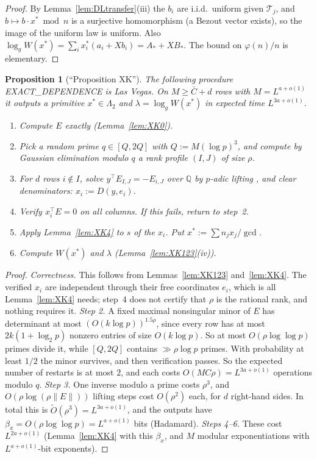 \documentclass[11pt]{amsart}
\newtheorem{proposition}[theorem]{Proposition}
\theoremstyle{definition}
\newcommand{\Q}{\mathbb{Q}}
\newcommand{\cT}{\mathcal{T}}
\begin{document}
\begin{proof}
By Lemma~\ref{lem:DLtransfer}(iii) the $b_i$ are i.i.d.\ uniform given $\cT_j$, and $b\mapsto b\cdot x^*\bmod n$ is a surjective homomorphism
(a Bezout vector exists), so the image of the uniform law is uniform. Also $\log_gW(x^*)=\sum_ix^*_i(a_i+Xb_i)=A_*+XB_*$. The bound on $\varphi(n)/n$ is
elementary.
\end{proof}

\begin{proposition}[``Proposition XK'']\label{prop:XK}
The following procedure EXACT\_DEPENDENCE is Las Vegas. On $M\ge\bar C+d$ rows with $M=L^{a+o(1)}$ it outputs a primitive $x^*\in\Lambda_2$ and
$\lambda=\log_gW(x^*)$ in expected time $L^{3a+o(1)}$.
\begin{enumerate}[label=\arabic*.]
\item Compute $E$ exactly (Lemma~\ref{lem:XK0}).
\item Pick a random prime $q\in[Q,2Q]$ with $Q:=M(\log p)^3$, and compute by Gaussian elimination modulo $q$ a rank profile $(I,J)$ of size $\rho$.
\item For $d$ rows $i\notin I$, solve $y^\top E_{I,J}=-E_{i,J}$ over $\Q$ by $p$-adic lifting \cite{dixon1982}, and clear denominators: $x_i:=D(y,e_i)$.
\item Verify $x_i^\top E=0$ on all columns. If this fails, return to step~2.
\item Apply Lemma~\ref{lem:XK4} to $s$ of the $x_i$. Put $x^*:=\sum n_jx_j/\gcd$.
\item Compute $W(x^*)$ and $\lambda$ (Lemma~\ref{lem:XK123}(iv)).
\end{enumerate}
\end{proposition}

\begin{proof}
\emph{Correctness.} This follows from Lemmas~\ref{lem:XK123} and~\ref{lem:XK4}. The verified $x_i$ are independent through their free coordinates $e_i$,
which is all Lemma~\ref{lem:XK4} needs; step~4 does not certify that $\rho$ is the rational rank, and nothing requires it.
\emph{Step 2.} A fixed maximal nonsingular minor of $E$ has determinant at most $(O(k\log p))^{1.5\rho}$, since every row has at most $2k(1+\log_2p)$
nonzero entries of size $O(k\log p)$. So at most $O(\rho\log\log p)$ primes divide it, while $[Q,2Q]$ contains $\gg\rho\log p$ primes. With probability
at least $1/2$ the minor survives, and then verification passes. So the expected number of restarts is at most $2$, and each costs
$O(MC\rho)=L^{3a+o(1)}$ operations modulo $q$.
\emph{Step 3.} One inverse modulo a prime costs $\rho^3$, and $O(\rho\log(\rho\|E\|))$ lifting steps cost $O(\rho^2)$ each, for $d$ right-hand sides. In total
this is $\tilde O(\rho^3)=L^{3a+o(1)}$, and the outputs have $\beta_x=O(\rho\log\log p)=L^{a+o(1)}$ bits (Hadamard).
\emph{Steps 4--6.} These cost $L^{2a+o(1)}$ (Lemma~\ref{lem:XK4} with this $\beta_x$, and $M$ modular exponentiations with $L^{a+o(1)}$-bit exponents).
\end{proof}
\end{document}
